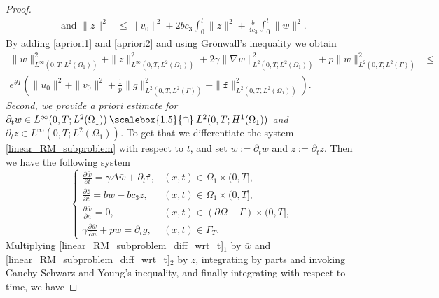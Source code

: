 \documentclass[11pt]{article}
\newcommand*{\medcap}{\mathbin{\scalebox{1.5}{\ensuremath{\cap}}}}
\begin{document}
\begin{proof}
\begin{equation}\label{apriori2}
\begin{aligned}
\text{ and } \parallel z\parallel^2 & \leq \parallel v_0\parallel^2 + 
 2bc_3 \int_0^t \parallel z \parallel^2 + \frac{b}{4c_3}\int_0^t \parallel w \parallel^2.
\end{aligned}
\end{equation}
By adding \eqref{apriori1} and \eqref{apriori2} and using Gr\"{o}nwall's inequality we obtain 
\begin{equation}\label{apriori3}
\begin{aligned}
\parallel w\parallel_{L^{\infty}(0,T; L^2(\Omega_1))}^2+\parallel z\parallel_{L^{\infty}(0,T; L^2(\Omega_1))}^2+ 2\gamma\parallel \nabla w\parallel_{L^{2}(0,T; L^2(\Omega_1))}^2 + p\parallel w\parallel_{L^{2}(0,T; L^2(\Gamma))}^2 & \leq \\
e^{\theta T} \left( \parallel u_0\parallel^2 + \parallel v_0\parallel^2 + \frac{1}{p}\parallel g\parallel^2_{L^{2}(0,T; L^2(\Gamma))} + \parallel \mathtt{f}\parallel^2_{L^{2}(0,T; L^2(\Omega_1))} \right).
\end{aligned}
\end{equation}
\textit{Second, we provide a priori estimate for $\partial_t w\in L^{\infty}(0,T; L^2(\Omega_1))\medcap L^{2}(0,T; H^1(\Omega_1))$ and $\partial_t z\in L^{\infty}(0,T; L^2(\Omega_1))$.} To get that we differentiate the system \eqref{linear_RM_subproblem} with respect to $t$, and set $\bar{w}:=\partial_t w$ and $\bar{z}:=\partial_t z$. Then we have the following system
\begin{equation}\label{linear_RM_subproblem_diff_wrt_t}
\begin{cases}
\frac{\partial \bar{w}}{\partial t}  = \gamma \Delta \bar{w} + \partial_t\mathtt{f}, & (x,t)\in\Omega_1\times(0,T],\\
\frac{\partial \bar{z}}{\partial t} = b\bar{w} - bc_3\bar{z} , & (x,t)\in\Omega_1\times(0,T],\\
\frac{\partial \bar{w}}{\partial n}=0, & (x,t)\in\left(\partial\Omega - \Gamma\right)\times(0,T],\\
\gamma\frac{\partial \bar{w}}{\partial n} + p\bar{w}
 = \partial_t g,  & (x,t)\in\Gamma_T.
\end{cases}
\end{equation}
Multiplying \eqref{linear_RM_subproblem_diff_wrt_t}$_1$ by $\bar{w}$ and \eqref{linear_RM_subproblem_diff_wrt_t}$_2$ by $\bar{z}$, integrating by parts and invoking Cauchy-Schwarz and Young's inequality, and finally integrating with respect to time, we have  

\end{proof}
\end{document}

